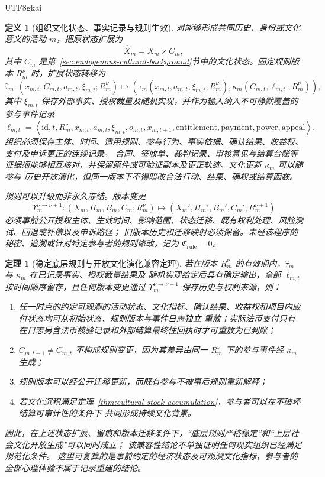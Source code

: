 \documentclass[12pt,a4paper,openany]{report}
\newtheorem{definition}{定义}[chapter]
\newtheorem{theorem}{定理}[chapter]
\newcommand{\Tuple}[1]{\left\langle #1\right\rangle}
\begin{document}
\begin{CJK*}{UTF8}{gkai}
\begin{definition}[组织文化状态、事实记录与规则生效]
\label{def:organization-cultural-extension}
对能够形成共同历史、身份或文化意义的活动 \(m\)，把原状态扩展为
\[
  \widehat X_m=X_m\times C_m,
\]
其中 \(C_m\) 是第~\ref{sec:endogenous-cultural-background}节中的文化状态。固定规则版本
\(R_m^\nu\) 时，扩展状态转移为
\[
  \widehat\tau_m:
  (x_{m,t},C_{m,t},a_{m,t},\xi_{m,t};R_m^\nu)
  \longmapsto
  \left(
  \tau_m(x_{m,t},a_{m,t},\xi_{m,t};R_m^\nu),
  \kappa_m(C_{m,t},\ell_{m,t};R_m^\nu)
  \right),
\]
其中 \(\xi_{m,t}\) 保存外部事实、授权裁量及随机实现，并作为输入纳入不可静默覆盖的参与事件记录
\[
  \ell_{m,t}
  =
  \Tuple{
  \mathrm{id},t,R_m^\nu,x_{m,t},a_{m,t},
  \xi_{m,t},o_{m,t},x_{m,t+1},
  \mathrm{entitlement},\mathrm{payment},
  \mathrm{power},\mathrm{appeal}
  }.
\]
组织必须保存主体、时间、适用规则、参与行为、事实依据、确认结果、收益权、支付及申诉更正的连续记录。
合同、签收单、裁判记录、审核意见与结算台账等证据须能够相互核对，并保留原件或可验证副本及更正轨迹。文化更新 \(\kappa_m\) 可以随参与
历史开放演化，但同一版本下不得暗改合法行动、结果、确权或结算函数。

规则可以升级而非永久冻结。版本变更
\[
  \Upsilon_m^{\nu\to\nu+1}:
  (X_m,H_m,B_m,C_m;R_m^\nu)
  \longmapsto
  (X_m',H_m',B_m',C_m';R_m^{\nu+1})
\]
必须事前公开授权主体、生效时间、影响范围、状态迁移、既有权利处理、风险测试、回退或补偿以及申诉路径；
旧版本历史和迁移映射必须保留。未经该程序的秘密、追溯或针对特定参与者的规则修改，记为
\(\mathfrak C_{\mathrm{rule}}=0\)。
\end{definition}

\begin{theorem}[稳定底层规则与开放文化演化兼容定理]
\label{thm:stable-rule-open-culture}
若在版本 \(R_m^\nu\) 的有效期内，\(\widehat\tau_m\) 与 \(\kappa_m\) 在已记录事实、授权裁量结果及
随机实现给定后具有确定输出，全部 \(\ell_{m,t}\) 按时间顺序留存，且任何版本变更通过
\(\Upsilon_m^{\nu\to\nu+1}\) 保存历史与权利来源，则：
\begin{enumerate}[label=\textup{(\roman*)},leftmargin=3em]
  \item 任一时点的约定可观测的活动状态、文化指标、确认结果、收益权和项目内应付状态均可从初始状态、规则版本与事件日志独立
  重放；实际法币支付只有在日志另含法币核验记录和外部结算最终性回执时才可重放为已到账；
  \item \(C_{m,t+1}\ne C_{m,t}\) 不构成规则变更，因为其差异由同一
  \(R_m^\nu\) 下的参与事件经 \(\kappa_m\) 生成；
  \item 规则版本可以经公开迁移更新，而既有参与不被事后规则重新解释；
  \item 若文化沉积满足定理~\ref{thm:cultural-stock-accumulation}，参与者可以在不破坏结算可审计性的条件下
  共同形成持续文化背景。
\end{enumerate}
因此，在上述状态扩展、留痕和版本迁移条件下，“底层规则严格稳定”和“上层社会文化开放生成”可以同时成立；
该兼容性结论不单独证明任何现实组织已经满足规范化条件。
这里可复算的是事前约定的经济状态及可观测文化指标，参与者的全部心理体验不属于记录重建的结论。
\end{theorem}


\end{CJK*}
\end{document}
